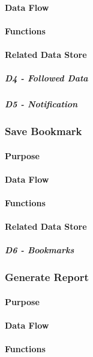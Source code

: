 \paragraph{Data Flow}

\paragraph{Functions}

\paragraph{Related Data Store}
\subparagraph{D4 - Followed Data}

\subparagraph{D5 - Notification}

\subsubsection*{Save Bookmark}
\paragraph{Purpose}

\paragraph{Data Flow}

\paragraph{Functions}

\paragraph{Related Data Store}
\subparagraph{D6 - Bookmarks}

\subsubsection*{Generate Report}
\paragraph{Purpose}

\paragraph{Data Flow}

\paragraph{Functions}

